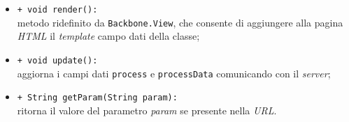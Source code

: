 \begin{flushleft}
\begin{itemize}
\begin{sloppypar}
\begin{itemize}
\item \texttt{+ void render():}\\ metodo ridefinito da \texttt{Backbone.View}, che consente di aggiungere alla pagina \textit{HTML} il \textit{template} campo dati della classe;
\item \texttt{+ void update():}\\ aggiorna i campi dati \texttt{process} e \texttt{processData} comunicando con il \textit{server};
\item \texttt{+ String getParam(String param):}\\ ritorna il valore del parametro \textit{param} se presente nella \textit{URL}.
\end{itemize}
\end{sloppypar}
\end{itemize}
\end{flushleft}

